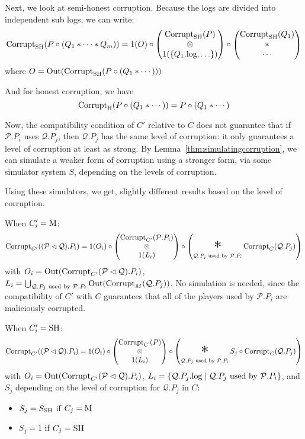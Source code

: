 \begin{theorem}
Next, we look at semi-honest corruption.
Because the logs are divided into independent sub logs, we can write:
$$
\text{Corrupt}_{\text{SH}}(P \circ (Q_1 * \cdots * Q_m)) =
1(O) \circ
\begin{pmatrix}
  \text{Corrupt}_{\text{SH}}(P)\cr
  \otimes\cr
  1(\{Q_1.\text{log}, \ldots\})
\end{pmatrix}
\circ
\begin{pmatrix}
  \text{Corrupt}_{\text{SH}}(Q_1)\cr
  *\cr
  \cdots
\end{pmatrix}
$$
where $O = \text{Out}(\text{Corrupt}_{\text{SH}}(P \circ (Q_1 * \cdots)))$

And for honest corruption, we have
$$
\text{Corrupt}_{\text{H}}(P \circ (Q_1 * \cdots)) = P \circ (Q_1 * \cdots)
$$

Now, the compatibility condition of $C'$ relative to $C$
does not guarantee that if $\mathcal{P}.P_i$ uses $\mathcal{Q}.P_j$,
then $\mathcal{Q}.P_j$ has the same level of corruption: 
it only guarantees a level of corruption at least as strong.
By Lemma~\ref{thm:simulatingcorruption}, we can simulate a weaker
form of corruption using a stronger form, via some simulator system $S$,
depending on the levels of corruption.

Using these simulators, we get, slightly different results based
on the level of corruption.

When $C'_i = \text{M}$:
$$
\tx{Corrupt}_{C'}((\mathcal{P} \lhd \mathcal{Q}).P_i) =
1(O_i) \circ
\begin{pmatrix}
  \tx{Corrupt}_{C'}(\mathcal{P}.P_i)\cr
  \otimes\cr
  1(L_i)\cr
\end{pmatrix}
\circ
\left(
\bigast_{\mathcal{Q}.P_j \tx{ used by } \mathcal{P}.P_i}
  \tx{Corrupt}_C(\mathcal{Q}.P_j)
\right)
$$
with $O_i = \text{Out}(\text{Corrupt}_{C'}(\mathcal{P} \lhd \mathcal{Q}).P_i)$, $L_i= \bigcup_{\mathcal{Q}.P_j \text{ used by } \mathcal{P}.P_i} \text{Out}(\text{Corrupt}_M(\mathcal{Q}.P_j))$.
No simulation is needed, since the compatibility of $C'$ with $C$
guarantees that all of the players used by $\mathcal{P}.P_i$
are maliciously corrupted.

When $C'_i = \text{SH}$:
$$
\tx{Corrupt}_{C'}((\mathcal{P} \lhd \mathcal{Q}).P_i) =
1(O_i) \circ
\begin{pmatrix}
  \tx{Corrupt}_{\tx{C'}}(P)\cr
  \otimes\cr
  1(L_i)
\end{pmatrix}
\circ
\left(
\bigast_{\mathcal{Q}.P_j \tx{ used by } \mathcal{P}.P_i}
  S_j \circ \tx{Corrupt}_C(\mathcal{Q}.P_j)
\right)
$$
with $O_i = \text{Out}(\text{Corrupt}_{C'}(\mathcal{P} \lhd \mathcal{Q}).P_i)$,
$L_i = \{\mathcal{Q}.P_j.\text{log} \mid \mathcal{Q}.P_j \text{ used by } \mathcal{P}.P_i \}$,
and $S_j$ depending on the level of corruption for $\mathcal{Q}.P_j$ in $C$:
\begin{itemize}
  \item $S_j = S_{\text{SH}}$ if $C_j = \text{M}$
  \item $S_j = 1$ if $C_j = \text{SH}$
\end{itemize}


\end{theorem}
